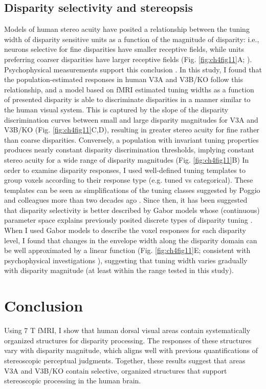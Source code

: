 \subsection{Disparity selectivity and stereopsis}
Models of human stereo acuity have posited a relationship between the tuning width of disparity sensitive units as a function of the magnitude of disparity: i.e., neurons selective for fine disparities have smaller receptive fields, while units preferring coarser disparities have larger receptive fields (Fig. \ref{fig:ch4fig11}A; \cite{Lehky:1990fk}). Psychophysical measurements support this conclusion \cite{Stevenson:1992kx}. In this study, I found that the population-estimated responses in human V3A and V3B/KO follow this relationship, and a model based on fMRI estimated tuning widths as a function of presented disparity is able to discriminate disparities in a manner similar to the human visual system. This is captured by the slope of the disparity discrimination curves between small and large disparity magnitudes for V3A and V3B/KO (Fig. \ref{fig:ch4fig11}C,D), resulting in greater stereo acuity for fine rather than coarse disparities. Conversely, a population with invariant tuning properties produces nearly constant disparity discrimination thresholds, implying constant stereo acuity for a wide range of disparity magnitudes (Fig. \ref{fig:ch4fig11}B)
In order to examine disparity responses, I used well-defined tuning templates to group voxels according to their response type (e.g. tuned vs categorical). These templates can be seen as simplifications of the tuning classes suggested by Poggio and colleagues more than two decades ago \cite{Poggio:1988ij}. Since then, it has been suggested that disparity selectivity is better described by Gabor models whose (continuous) parameter space explains previously posited discrete types of disparity tuning \cite{Prince:2002uq}. When I used Gabor models to describe the voxel responses for each disparity level, I found that changes in the envelope width along the disparity domain can be well approximated by a linear function (Fig. \ref{fig:ch4fig11}E; consistent with psychophysical investigations \cite{Stevenson:1992kx}), suggesting that tuning width varies gradually with disparity magnitude (at least within the range tested in this study). 

\section{Conclusion}
Using 7 T fMRI, I show that human dorsal visual areas contain systematically organized structures for disparity processing. The responses of these structures vary with disparity magnitude, which aligns well with previous quantifications of stereoscopic perceptual judgments. Together, these results suggest that areas V3A and V3B/KO contain selective, organized structures that support stereoscopic processing in the human brain.



